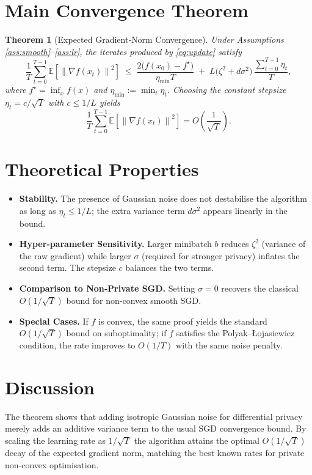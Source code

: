 \documentclass{article}
\newtheorem{theorem}{Theorem}
\newcommand{\E}{\mathbb{E}}
\newcommand{\norm}[1]{\left\|#1\right\|}
\begin{document}
\section*{Main Convergence Theorem}
\begin{theorem}[Expected Gradient‑Norm Convergence]\label{thm:main}
Under Assumptions \ref{ass:smooth}–\ref{ass:lr}, the iterates produced by \eqref{eq:update} satisfy
\[
\frac{1}{T}\sum_{t=0}^{T-1}\E\!\left[\norm{\nabla f(x_{t})}^{2}\right]
\;\le\;
\frac{2\bigl(f(x_{0})-f^{\star}\bigr)}{\eta_{\min} T}
\;+\;
L\bigl(\zeta^{2}+d\sigma^{2}\bigr)\,\frac{\sum_{t=0}^{T-1}\eta_{t}}{T},
\]
where $f^{\star}=\inf_{x}f(x)$ and $\eta_{\min}:=\min_{t}\eta_{t}$.  
Choosing the constant stepsize $\eta_{t}=c/\sqrt{T}$ with $c\le1/L$ yields
\[
\frac{1}{T}\sum_{t=0}^{T-1}\E\!\left[\norm{\nabla f(x_{t})}^{2}\right]
=O\!\left(\frac{1}{\sqrt{T}}\right).
\]
\end{theorem}

\section*{Theoretical Properties}
\begin{itemize}
\item \textbf{Stability.} The presence of Gaussian noise does not destabilise the algorithm as long as $\eta_{t}\le 1/L$; the extra variance term $d\sigma^{2}$ appears linearly in the bound.
\item \textbf{Hyper‑parameter Sensitivity.} Larger minibatch $b$ reduces $\zeta^{2}$ (variance of the raw gradient) while larger $\sigma$ (required for stronger privacy) inflates the second term. The stepsize $c$ balances the two terms.
\item \textbf{Comparison to Non‑Private SGD.} Setting $\sigma=0$ recovers the classical $O(1/\sqrt{T})$ bound for non‑convex smooth SGD.
\item \textbf{Special Cases.} If $f$ is convex, the same proof yields the standard $O(1/\sqrt{T})$ bound on suboptimality; if $f$ satisfies the Polyak–Łojasiewicz condition, the rate improves to $O(1/T)$ with the same noise penalty.
\end{itemize}

\section*{Discussion}
The theorem shows that adding isotropic Gaussian noise for differential privacy merely adds an additive variance term to the usual SGD convergence bound. By scaling the learning rate as $1/\sqrt{T}$ the algorithm attains the optimal $O(1/\sqrt{T})$ decay of the expected gradient norm, matching the best known rates for private non‑convex optimisation.
\end{document}
